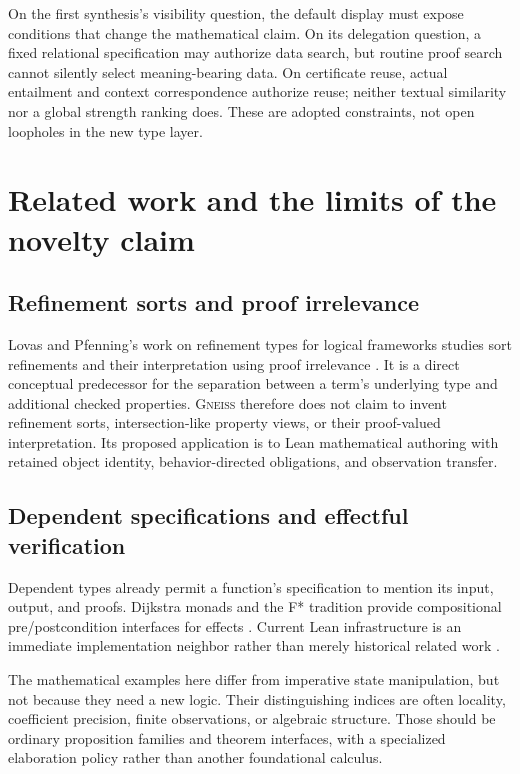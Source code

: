 \documentclass[11pt,letterpaper]{article}
\newcommand{\code}[1]{\texttt{\detokenize{#1}}}
\newcommand{\Gneiss}{\textsc{Gneiss}}
\theoremstyle{definition}
\theoremstyle{remark}
\begin{document}
On the first synthesis's visibility question, the default display must expose
conditions that change the mathematical claim. On its delegation question,
a fixed relational specification may authorize data search, but routine
proof search cannot silently select meaning-bearing data. On certificate
reuse, actual entailment and context correspondence authorize reuse; neither
textual similarity nor a global strength ranking does. These are adopted
constraints, not open loopholes in the new type layer.

\section{Related work and the limits of the novelty claim}\label{sec:related}

\subsection{Refinement sorts and proof irrelevance}
Lovas and Pfenning's work on refinement types for logical frameworks studies
sort refinements and their interpretation using proof irrelevance
\cite{lovas-pfenning}. It is a direct conceptual predecessor for the separation
between a term's underlying type and additional checked properties. \Gneiss{}
therefore does not claim to invent refinement sorts, intersection-like property
views, or their proof-valued interpretation. Its proposed application is to
Lean mathematical authoring with retained object identity, behavior-directed
obligations, and observation transfer.

\subsection{Dependent specifications and effectful verification}
Dependent types already permit a function's specification to mention its input,
output, and proofs. Dijkstra monads and the F* tradition provide compositional
pre/postcondition interfaces for effects \cite{dm4free}. Current Lean
\code{mvcgen} infrastructure is an immediate implementation neighbor rather
than merely historical related work \cite{lean-mvcgen}.

The mathematical examples here differ from imperative state manipulation, but
not because they need a new logic. Their distinguishing indices are often
locality, coefficient precision, finite observations, or algebraic structure.
Those should be ordinary proposition families and theorem interfaces, with a
specialized elaboration policy rather than another foundational calculus.
\end{document}
